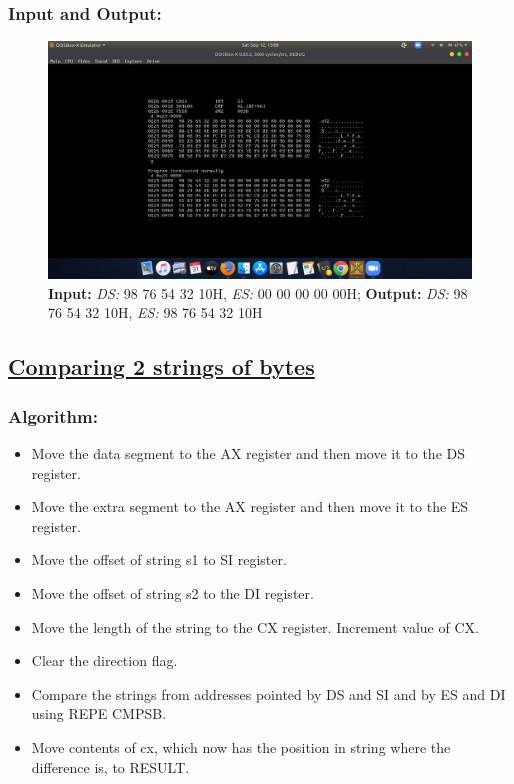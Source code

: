 \documentclass[12pt,a4paper]{article}
\begin{document}
\begin{flushleft}
\subsubsection*{\textbf{Input and Output:}}
\begin{figure}[h]
    \centering
    \includegraphics[trim = 100mm 60mm 100mm 80mm, clip, width = \textwidth]{Pics/StrmovIO.png}
    \caption{ \textbf{Input:} \emph{DS:} 98 76 54 32 10H, \emph{ES:} 00 00 00 00 00H; \newline \hspace{1cm}
              \textbf{Output:} \emph{DS:} 98 76 54 32 10H, \emph{ES:} 98 76 54 32 10H}
\end{figure}
\subsection*{\textbf{\underline{Comparing 2 strings of bytes}}}

\subsubsection*{\textbf{Algorithm:}}
\begin{itemize}
    \item Move the data segment to the AX register and then move it to the DS register.
    \item Move the extra segment to the AX register and then move it to the ES register.
    \item Move the offset of string s1 to SI register. 
    \item Move the offset of string s2 to the DI register. 
    \item Move the length of the string to the CX register. Increment value of CX.
    \item Clear the direction flag. 
    \item Compare the strings from addresses pointed by DS and SI and by ES and DI using REPE CMPSB.
    \item Move contents of cx, which now has the position in string where the difference is, to RESULT.
\end{itemize}


\end{flushleft}
\end{document}
